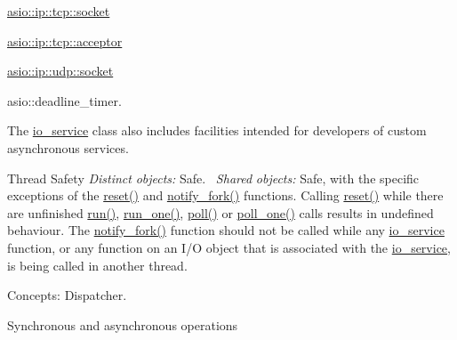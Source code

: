 \begin{DoxyItemize}
\item \hyperlink{classasio_1_1ip_1_1tcp_a6f5bf95251747bb81d75784387938d6a}{asio\+::ip\+::tcp\+::socket} \item \hyperlink{classasio_1_1ip_1_1tcp_a09a6c28b61af7d9d7680c03ba5062f67}{asio\+::ip\+::tcp\+::acceptor} \item \hyperlink{classasio_1_1ip_1_1udp_ab8f8cc1a666bdbbd6c3963f2396f253e}{asio\+::ip\+::udp\+::socket} \item asio\+::deadline\+\_\+timer.\end{DoxyItemize}
The \hyperlink{classasio_1_1io__service}{io\+\_\+service} class also includes facilities intended for developers of custom asynchronous services.

\begin{DoxyParagraph}{Thread Safety}
{\itshape Distinct} {\itshape objects\+:} Safe.~\newline
{\itshape Shared} {\itshape objects\+:} Safe, with the specific exceptions of the \hyperlink{classasio_1_1io__service_a28a4283881eba54d415409ad604384f8}{reset()} and \hyperlink{classasio_1_1io__service_af1e9678ed8a80730fa86ad92225e0999}{notify\+\_\+fork()} functions. Calling \hyperlink{classasio_1_1io__service_a28a4283881eba54d415409ad604384f8}{reset()} while there are unfinished \hyperlink{classasio_1_1io__service_ac84bed0d1dd061bc71010ba1228439da}{run()}, \hyperlink{classasio_1_1io__service_aa83c06ec5cc7bde25c64d89530998408}{run\+\_\+one()}, \hyperlink{classasio_1_1io__service_afcc99e506862edaf34ac124c0e7f0242}{poll()} or \hyperlink{classasio_1_1io__service_acbdbe60a4582f7f77f5bdb85d4e76013}{poll\+\_\+one()} calls results in undefined behaviour. The \hyperlink{classasio_1_1io__service_af1e9678ed8a80730fa86ad92225e0999}{notify\+\_\+fork()} function should not be called while any \hyperlink{classasio_1_1io__service}{io\+\_\+service} function, or any function on an I/\+O object that is associated with the \hyperlink{classasio_1_1io__service}{io\+\_\+service}, is being called in another thread.
\end{DoxyParagraph}
\begin{DoxyParagraph}{Concepts\+:}
Dispatcher.
\end{DoxyParagraph}
\begin{DoxyParagraph}{Synchronous and asynchronous operations}

\end{DoxyParagraph}
